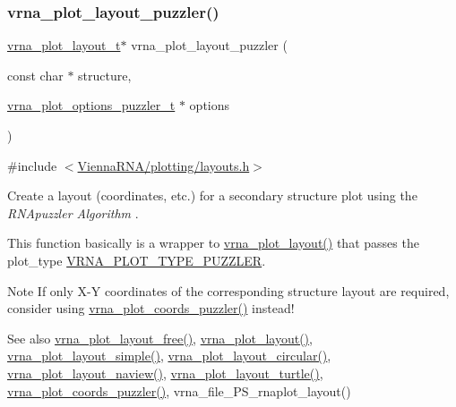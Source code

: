 \subsubsection{\texorpdfstring{vrna\_plot\_layout\_puzzler()}{vrna\_plot\_layout\_puzzler()}}
{\footnotesize\ttfamily \mbox{\hyperlink{group__plot__layout__utils_gac986fe092abc2a6a93ceb5141e4dd28b}{vrna\+\_\+plot\+\_\+layout\+\_\+t}}$\ast$ vrna\+\_\+plot\+\_\+layout\+\_\+puzzler (\begin{DoxyParamCaption}\item[{const char $\ast$}]{structure,  }\item[{\mbox{\hyperlink{group__plot__layout__utils_structvrna__plot__options__puzzler__t}{vrna\+\_\+plot\+\_\+options\+\_\+puzzler\+\_\+t}} $\ast$}]{options }\end{DoxyParamCaption})}



{\ttfamily \#include $<$\mbox{\hyperlink{layouts_8h}{Vienna\+R\+N\+A/plotting/layouts.\+h}}$>$}



Create a layout (coordinates, etc.) for a secondary structure plot using the {\itshape R\+N\+Apuzzler Algorithm} \cite{wiegreffe:2018}. 

This function basically is a wrapper to \mbox{\hyperlink{group__plot__layout__utils_ga7953b759eada86c61b0a4aebe0dc67d1}{vrna\+\_\+plot\+\_\+layout()}} that passes the {\ttfamily plot\+\_\+type} \mbox{\hyperlink{group__plot__layout__utils_ga64ec68055e241d11f659edb50f27ecae}{V\+R\+N\+A\+\_\+\+P\+L\+O\+T\+\_\+\+T\+Y\+P\+E\+\_\+\+P\+U\+Z\+Z\+L\+ER}}.

\begin{DoxyNote}{Note}
If only X-\/Y coordinates of the corresponding structure layout are required, consider using \mbox{\hyperlink{group__plot__layout__utils_gafd49896df8780c9669125429bc0da9b3}{vrna\+\_\+plot\+\_\+coords\+\_\+puzzler()}} instead!
\end{DoxyNote}
\begin{DoxySeeAlso}{See also}
\mbox{\hyperlink{group__plot__layout__utils_ga996128730020a2d7a7368b4248195931}{vrna\+\_\+plot\+\_\+layout\+\_\+free()}}, \mbox{\hyperlink{group__plot__layout__utils_ga7953b759eada86c61b0a4aebe0dc67d1}{vrna\+\_\+plot\+\_\+layout()}}, \mbox{\hyperlink{group__plot__layout__utils_ga8b09019a429c7c2447be94901c7ed658}{vrna\+\_\+plot\+\_\+layout\+\_\+simple()}}, \mbox{\hyperlink{group__plot__layout__utils_ga41d94adbd42e1a570d840756e6dd6909}{vrna\+\_\+plot\+\_\+layout\+\_\+circular()}}, \mbox{\hyperlink{group__plot__layout__utils_gab0e886afe200db9323e4e65d44738177}{vrna\+\_\+plot\+\_\+layout\+\_\+naview()}}, \mbox{\hyperlink{group__plot__layout__utils_ga4ecd3401e22933a44bf31d14320e59b1}{vrna\+\_\+plot\+\_\+layout\+\_\+turtle()}}, \mbox{\hyperlink{group__plot__layout__utils_gafd49896df8780c9669125429bc0da9b3}{vrna\+\_\+plot\+\_\+coords\+\_\+puzzler()}}, vrna\+\_\+file\+\_\+\+P\+S\+\_\+rnaplot\+\_\+layout()
\end{DoxySeeAlso}

